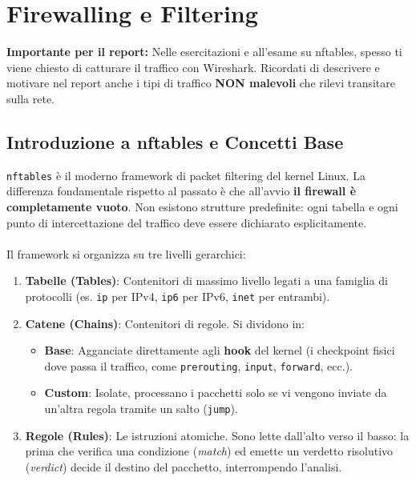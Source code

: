 \documentclass[12pt,a4paper]{report}
\begin{document}
	\chapter{Firewalling e Filtering}
	
	\begin{nota}
		\textbf{Importante per il report:} Nelle esercitazioni e all'esame su nftables, spesso ti viene chiesto di catturare il traffico con Wireshark. Ricordati di descrivere e motivare nel report anche i tipi di traffico \textbf{NON malevoli} che rilevi transitare sulla rete.
	\end{nota}
	
	\section{Introduzione a nftables e Concetti Base}
	
	\texttt{nftables} è il moderno framework di packet filtering del kernel Linux. La differenza fondamentale rispetto al passato è che all'avvio \textbf{il firewall è completamente vuoto}. Non esistono strutture predefinite: ogni tabella e ogni punto di intercettazione del traffico deve essere dichiarato esplicitamente.\\\\
	Il framework si organizza su tre livelli gerarchici:
	\begin{enumerate}
		\item \textbf{Tabelle (Tables)}: Contenitori di massimo livello legati a una famiglia di protocolli (es. \texttt{ip} per IPv4, \texttt{ip6} per IPv6, \texttt{inet} per entrambi).
		\item \textbf{Catene (Chains)}: Contenitori di regole. Si dividono in:
		\begin{itemize}
			\item \textbf{Base}: Agganciate direttamente agli \textbf{hook} del kernel (i checkpoint fisici dove passa il traffico, come \texttt{prerouting}, \texttt{input}, \texttt{forward}, ecc.).
			\item \textbf{Custom}: Isolate, processano i pacchetti solo se vi vengono inviate da un'altra regola tramite un salto (\texttt{jump}).
		\end{itemize}
		\item \textbf{Regole (Rules)}: Le istruzioni atomiche. Sono lette dall'alto verso il basso: la prima che verifica una condizione (\textit{match}) ed emette un verdetto risolutivo (\textit{verdict}) decide il destino del pacchetto, interrompendo l'analisi.
	\end{enumerate}
	
\end{document}
